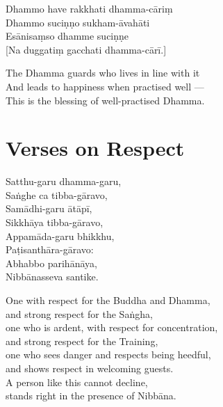 \begin{paritta}
\begin{paritta}
Dhammo have rakkhati dhamma-cāriṃ\\
Dhammo suciṇṇo sukham-āvahāti\\
Esānisaṃso dhamme suciṇṇe\\{}
[Na duggatiṃ gacchati dhamma-cārī.]
\end{paritta}


\begin{english}
  The Dhamma guards who lives in line with it\\
  And leads to happiness when practised well ---\\
  This is the blessing of well-practised Dhamma.
\end{english}



\section{Verses on Respect}



Satthu-garu dhamma-garu,\\
Saṅghe ca tibba-gāravo,\\
Samādhi-garu ātāpī,\\
Sikkhāya tibba-gāravo,\\
Appamāda-garu bhikkhu,\\
Paṭisanthāra-gāravo:\\
Abhabbo parihānāya,\\
Nibbānasseva santike.

\begin{english}
  One with respect for the Buddha and Dhamma,\\
  and strong respect for the Saṅgha,\\
  one who is ardent, with respect for concentration,\\
  and strong respect for the Training,\\
  one who sees danger and respects being heedful,\\
  and shows respect in welcoming guests.\\
  A person like this cannot decline,\\
  stands right in the presence of Nibbāna.
\end{english}


\end{paritta}
